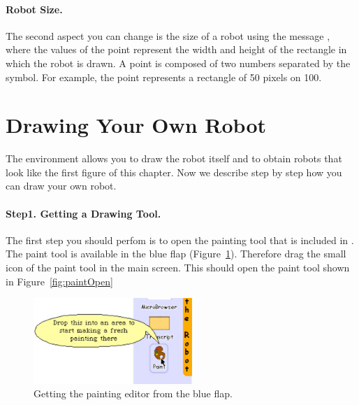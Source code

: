 \paragraph{Robot Size.}
The second aspect you can change is the size of a robot using the message  , where the values of the point represent the width and height of the rectangle in which the robot is drawn. A point is composed of two numbers separated by the  symbol. For example, the point  represents a rectangle of 50 pixels on 100.







\section{Drawing Your Own Robot}\label{sec:drawingTurtle}
The environment allows you to draw the robot itself and to obtain robots that look like the first figure of this chapter. Now we describe step by step how you can draw your own robot. 

\paragraph{Step1. Getting a Drawing Tool.}
The first step you should perfom is to open the painting tool that is included in \sq. The paint tool is available in the  blue flap (Figure~\ref{fig:paintToolCaroFlap}). Therefore drag the small icon of the paint tool in the main screen. This should open the paint tool shown in Figure~\ref{fig:paintOpen}

\begin{figure}
\begin{center}
\includegraphics[width=6cm]{paintToolCaroFlap} 
\end{center}
\caption{ \label{fig:paintToolCaroFlap} Getting the painting editor from the blue flap.}
\end{figure}





